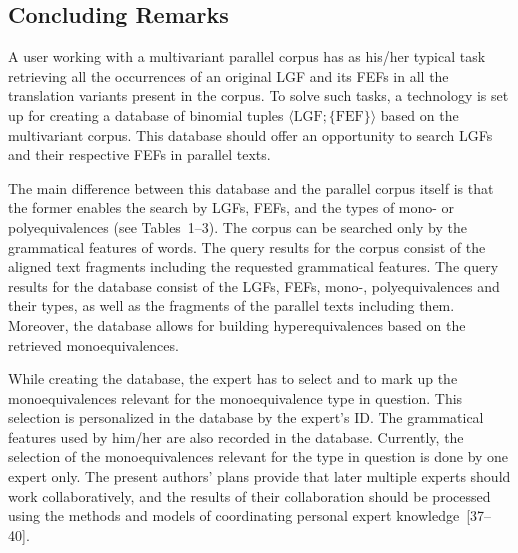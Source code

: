 \begin{multicols}{2}
\section{Concluding Remarks}

\noindent
   A user working with a multivariant parallel corpus has as his/her typical task retrieving all the 
occurrences of an original LGF and its FEFs in all the translation variants present in the corpus. To 
solve such tasks, a technology is set up for creating a database of binomial tuples 
$\langle\mathrm{LGF}; \{\mathrm{FEF}\}\rangle$ based on the multivariant corpus. This database 
should offer an opportunity to search LGFs and their respective FEFs in parallel texts.
   
   The main difference between this database and the parallel corpus itself is that the former 
enables the search by LGFs, FEFs, and the types of mono- or polyequivalences (see Tables~1--3). 
The corpus can be searched only by the grammatical features of words. The query results 
for the corpus consist of the aligned text fragments including the requested grammatical features. 
The query results for the database consist of the LGFs, FEFs, mono-, polyequivalences and their 
types, as well as the fragments of the parallel texts including them. Moreover, the database allows 
for building hyperequivalences based on the retrieved monoequivalences.
   
   While creating the database, the expert has to select and to mark up the monoequivalences 
relevant for the monoequivalence type in question. This selection is personalized in the database by 
the expert's ID. The grammatical features used by him/her are also recorded in the database. 
Currently, the selection of the monoequivalences relevant for the type in question is done by one 
expert only. The present authors' plans provide that later multiple experts should work collaboratively, and the 
results of their collaboration should be processed using the methods and models of coordinating 
personal expert knowledge~[37--40].

{\small\frenchspacing
{%
\begin{thebibliography}{99}


\end{thebibliography}}}
\end{multicols}
